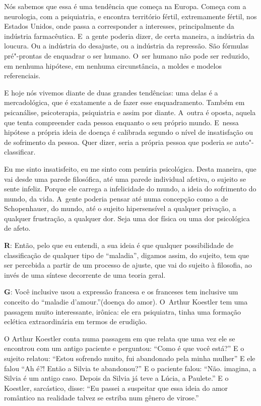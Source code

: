  

Nós sabemos que essa é uma tendência que começa na Europa. Começa com a
neurologia, com a psiquiatria, e encontra território fértil,
extremamente fértil, nos Estados Unidos, onde passa a corresponder a
interesses, principalmente da indústria farmacêutica. E~a gente poderia
dizer, de certa maneira, a indústria da loucura. Ou a indústria do
desajuste, ou a indústria da repressão. São fórmulas pré"-prontas de
enquadrar o ser humano. O~ser humano não pode ser reduzido, em nenhuma
hipótese, em nenhuma circunstância, a moldes e modelos referenciais.

 

E hoje nós vivemos diante de duas grandes tendências: uma delas é a
mercadológica, que é exatamente a de fazer esse enquadramento. Também em
psicanálise, psicoterapia, psiquiatria e assim por diante. A~outra é
oposta, aquela que tenta compreender cada pessoa enquanto o seu próprio
mundo. E~nessa hipótese a própria ideia de doença é calibrada segundo o
nível de insatisfação ou de sofrimento da pessoa. Quer dizer, seria a
própria pessoa que poderia se auto"-classificar.

 

Eu me sinto insatisfeito, eu me sinto com penúria psicológica. Desta
maneira, que vai desde uma parede filosófica, até uma parede individual
afetiva, o sujeito se sente infeliz. Porque ele carrega a infelicidade
do mundo, a ideia do sofrimento do mundo, da vida. A~gente poderia
pensar até numa concepção como a de Schopenhauer, do mundo, até o
sujeito hipersensível a qualquer privação, a qualquer frustração, a
qualquer dor. Seja uma dor física ou uma dor psicológica de afeto.

 

\textbf{R}: Então, pelo que eu entendi, a sua ideia é que qualquer
possibilidade de classificação de qualquer tipo de ``maladia'', digamos
assim, do sujeito, tem que ser percebida a partir de um processo de
ajuste, que vai do sujeito à filosofia, ao invés de uma síntese
decorrente de uma teoria geral.

 

\textbf{G}: Você inclusive usou a expressão francesa e os franceses tem
inclusive um conceito do ``maladie d'amour.''(doença do amor). O~Arthur
Koestler tem uma passagem muito interessante, irônica: ele era
psiquiatra, tinha uma formação eclética extraordinária em termos de
erudição.

O Arthur Koestler conta numa passagem em que relata que uma vez ele se
encontrou com um antigo paciente e perguntou: ``Como é que você está?''
E o sujeito relatou: ``Estou sofrendo muito, fui abandonado pela minha
mulher'' E ele falou ``Ah é?! Então a Silvia te abandonou?'' E o paciente
falou: ``Não. imagina, a Silvia é um antigo caso. Depois da Silvia já
teve a Lúcia, a Paulete.'' E o Koestler, sarcástico, disse: ``Eu passei a
suspeitar que essa ideia do amor romântico na realidade talvez se
estriba num gênero de virose.''

